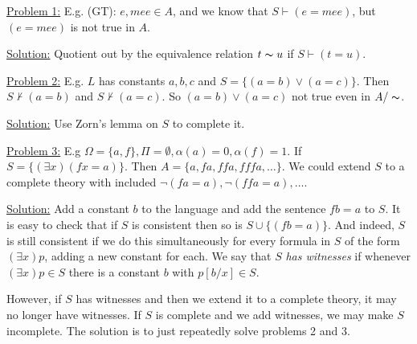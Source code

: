 \documentclass[10pt,a4paper]{article}
\begin{document}
\hspace*{-1em}\underline{Problem 1:} E.g. (GT): $e, mee \in A$, and we know that $S \vdash (e=mee)$, but $(e=mee)$ is not true in $A$.

\hspace*{-1em}\underline{Solution:} Quotient out by the equivalence relation $t \thicksim u$ if $S \vdash (t=u)$.

\hspace*{-1em}\underline{Problem 2:} E.g. $L$ has constants $a,b,c$ and $S = \{(a=b) \vee (a=c)\}$. Then $S \nvdash (a=b)$ and $S \nvdash (a=c)$. So $(a=b)\vee (a=c)$ not true even in $A/\thicksim$.

\hspace*{-1em}\underline{Solution:} Use Zorn's lemma on $S$ to complete it.

\hspace*{-1em}\underline{Problem 3:} E.g $\Omega = \{a, f\}, \Pi = \emptyset, \alpha(a) = 0, \alpha(f) = 1$. If $S = \{(\exists x)(fx=a)\}$. Then $A = \{a,fa,ffa,fffa,\ldots\}$. We could extend $S$ to a complete theory with included $\neg(fa=a), \neg(ffa=a), \ldots$.

\hspace*{-1em}\underline{Solution:} Add a constant $b$ to the language and add the sentence $fb=a$ to $S$. It is easy to check that if $S$ is consistent then so is $S \cup \{(fb=a)\}$. And indeed, $S$ is still consistent if we do this simultaneously for every formula in $S$ of the form $(\exists x)p$, adding a new constant for each. We say that $S$  \emph{has witnesses} if whenever $(\exists x)p \in S$ there is a constant $b$ with $p[b/x] \in S$.

However, if $S$ has witnesses and then we extend it to a complete theory, it may no longer have witnesses. If $S$ is complete and we add witnesses, we may make $S$ incomplete. The solution is to just repeatedly solve problems 2 and 3.
\end{document}
